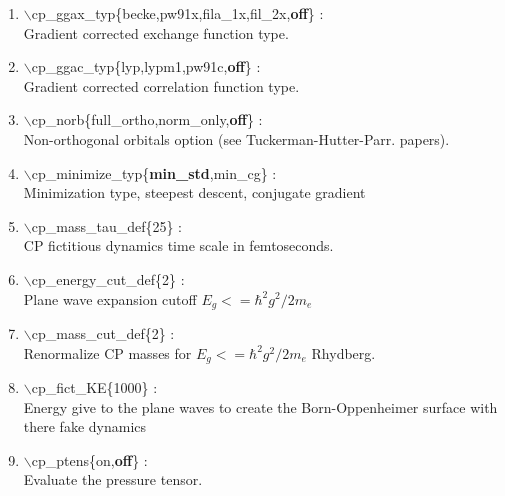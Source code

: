 \begin{itemize}
\begin{enumerate}
 \vspace{0.15in} \Large
 \item  $\backslash$cp\_ggax\_typ\{becke,pw91x,fila\_1x,fil\_2x,{\bf off}\} : \\
    \large
     Gradient corrected exchange function type.

 \vspace{0.15in} \Large
 \item  $\backslash$cp\_ggac\_typ\{lyp,lypm1,pw91c,{\bf off}\} : \\
    \large
     Gradient corrected correlation function type.

 \vspace{0.15in} \Large
 \item  $\backslash$cp\_norb\{full\_ortho,norm\_only,{\bf off}\} : \\
    \large
     Non-orthogonal orbitals option (see Tuckerman-Hutter-Parr. papers).

 \vspace{0.15in} \Large
 \item  $\backslash$cp\_minimize\_typ\{{\bf min\_std},min\_cg\} : \\
    \large
      Minimization type, steepest descent, conjugate gradient 

 \vspace{0.15in} \Large
 \item  $\backslash$cp\_mass\_tau\_def\{25\} : \\
    \large
      CP fictitious dynamics time scale in femtoseconds.

 \vspace{0.15in} \Large
 \item  $\backslash$cp\_energy\_cut\_def\{2\} : \\
    \large
      Plane wave expansion cutoff $E_g<=\hbar^2g^2/2m_e$ 

 \vspace{0.15in} \Large
 \item  $\backslash$cp\_mass\_cut\_def\{2\} : \\
    \large
      Renormalize CP masses for $E_g<=\hbar^2g^2/2m_e$ Rhydberg.

 \vspace{0.15in} \Large
 \item  $\backslash$cp\_fict\_KE\{1000\} : \\
    \large
      Energy give to the plane waves to create the Born-Oppenheimer
      surface with there fake dynamics

 \vspace{0.15in} \Large
 \item  $\backslash$cp\_ptens\{on,{\bf off}\} : \\
    \large
      Evaluate the pressure tensor. 


\end{enumerate}
\end{itemize}
